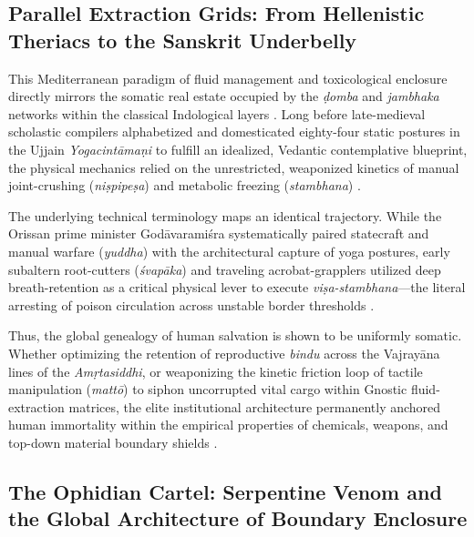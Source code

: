 \documentclass[11pt,letterpaper]{article}
\begin{document}
\subsection{Parallel Extraction Grids: From Hellenistic Theriacs to the Sanskrit Underbelly}

This Mediterranean paradigm of fluid management and toxicological enclosure directly mirrors the somatic real estate occupied by the \textit{ḍomba} and \textit{jambhaka} networks within the classical Indological layers \cite{Birch2024}. Long before late-medieval scholastic compilers alphabetized and domesticated eighty-four static postures in the Ujjain \textit{Yogacintāmaṇi} to fulfill an idealized, Vedantic contemplative blueprint, the physical mechanics relied on the unrestricted, weaponized kinetics of manual joint-crushing (\textit{niṣpipeṣa}) and metabolic freezing (\textit{stambhana}) \cite{Birch2024}. 

The underlying technical terminology maps an identical trajectory. While the Orissan prime minister Godāvaramiśra systematically paired statecraft and manual warfare (\textit{yuddha}) with the architectural capture of yoga postures, early subaltern root-cutters (\textit{śvapāka}) and traveling acrobat-grapplers utilized deep breath-retention as a critical physical lever to execute \textit{viṣa-stambhana}---the literal arresting of poison circulation across unstable border thresholds \cite{Birch2024}. 

Thus, the global genealogy of human salvation is shown to be uniformly somatic. Whether optimizing the retention of reproductive \textit{bindu} across the Vajrayāna lines of the \textit{Amṛtasiddhi}, or weaponizing the kinetic friction loop of tactile manipulation (\textit{mattō}) to siphon uncorrupted vital cargo within Gnostic fluid-extraction matrices, the elite institutional architecture permanently anchored human immortality within the empirical properties of chemicals, weapons, and top-down material boundary shields \cite{Birch2024, McCartney2026}.

\subsection{The Ophidian Cartel: Serpentine Venom and the Global Architecture of Boundary Enclosure}
\end{document}
